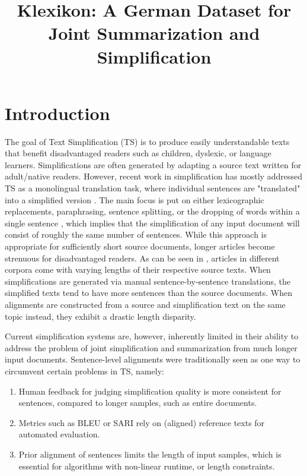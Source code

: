 \documentclass[10pt, a4paper]{article}
\title{Klexikon: A German Dataset for Joint Summarization and Simplification}
\begin{document}
\maketitleabstract




\section{Introduction}

The goal of Text Simplification (TS) is to produce easily understandable texts that benefit disadvantaged readers such as children, dyslexic, or language learners. Simplifications are often generated by adapting a source text written for adult/native readers. 
However, recent work in simplification has mostly addressed TS as a monolingual translation task, where individual sentences are "translated" into a simplified version \cite{zhu-etal-2010-monolingual,coster-kauchak-2011-simple,hwang-etal-2015-aligning}.
The main focus is put on either lexicographic replacements, paraphrasing, sentence splitting, or the dropping of words within a single sentence \cite{amancio-specia-2014-analysis}, which implies that the simplification of any input document will consist of roughly the same number of sentences.
While this approach is appropriate for sufficiently short source documents, longer articles become strenuous for disadvantaged readers. As can be seen in , articles in different corpora come with varying lengths of their respective source texts. When simplifications are generated via manual sentence-by-sentence translations, the simplified texts tend to have more sentences than the source documents. When alignments are constructed from a source and simplification text on the same topic instead, they exhibit a drastic length disparity.

Current simplification systems are, however, inherently limited in their ability to address the problem of joint simplification and summarization from much longer input documents.
Sentence-level alignments were traditionally seen as one way to circumvent certain problems in TS, namely:
\begin{enumerate}
	\item Human feedback for judging simplification quality is more consistent for sentences, compared to longer samples, such as entire documents.
	\item Metrics such as BLEU \cite{papineni-etal-2002-bleu} or SARI \cite{xu-etal-2016-optimizing} rely on (aligned) reference texts for automated evaluation.
	\item Prior alignment of sentences limits the length of input samples, which is essential for algorithms with non-linear runtime, or length constraints.
\end{enumerate}
\end{document}

